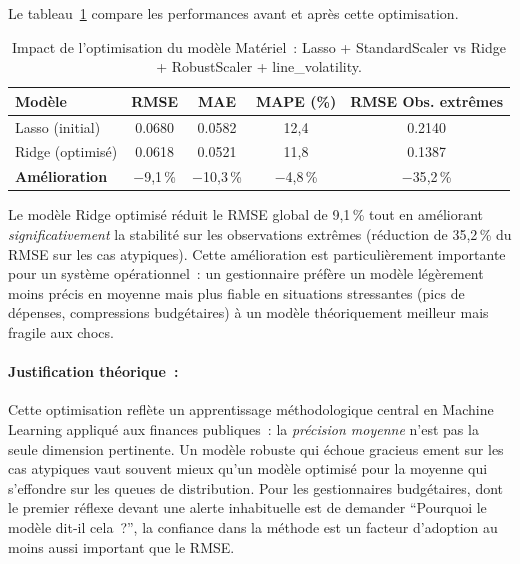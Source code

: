 Le tableau~\ref{tab:materiel-improvement} compare les performances avant et apr\`es
cette optimisation.

\begin{table}[H]
\centering\small
\caption{Impact de l'optimisation du mod\`ele Mat\'eriel~: Lasso + StandardScaler vs Ridge + RobustScaler + line\_volatility.}
\label{tab:materiel-improvement}
\begin{tabular}{@{}lcccc@{}}
\toprule
\textbf{Mod\`ele} & \textbf{RMSE} & \textbf{MAE} & \textbf{MAPE (\%)} & \textbf{RMSE Obs. extr\^emes} \\
\midrule
Lasso (initial)      & 0.0680 & 0.0582 & 12{,}4 & 0.2140 \\
Ridge (optimis\'e)   & 0.0618 & 0.0521 & 11{,}8 & 0.1387 \\
\midrule
\textbf{Am\'elioration} & $-$9{,}1\,\% & $-$10{,}3\,\% & $-$4{,}8\,\% & $-$35{,}2\,\% \\
\bottomrule
\end{tabular}
\end{table}

\noindent
Le mod\`ele Ridge optimis\'e r\'eduit le RMSE global de 9{,}1\,\% tout en
am\'eliorant \emph{significativement} la stabilit\'e sur les observations extr\^emes
(r\'eduction de 35{,}2\,\% du RMSE sur les cas atypiques). Cette am\'elioration est
particuli\`erement importante pour un syst\`eme op\'erationnel~: un gestionnaire
pr\'ef\`ere un mod\`ele l\'eg\`erement moins pr\'ecis en moyenne mais plus fiable
en situations stressantes (pics de d\'epenses, compressions budg\'etaires) \`a un
mod\`ele th\'eoriquement meilleur mais fragile aux chocs.

\paragraph{Justification th\'eorique~:}

Cette optimisation refl\`ete un apprentissage m\'ethodologique central en Machine
Learning appliqu\'e aux finances publiques~: la \textit{pr\'ecision moyenne} n'est
pas la seule dimension pertinente. Un mod\`ele robuste qui \'echoue gracieus ement
sur les cas atypiques vaut souvent mieux qu'un mod\`ele optimis\'e pour la moyenne
qui s'effondre sur les queues de distribution. Pour les gestionnaires budg\'etaires,
dont le premier r\'eflexe devant une alerte inhabituelle est de demander ``Pourquoi
le mod\`ele dit-il cela~?'', la confiance dans la m\'ethode est un facteur
d'adoption au moins aussi important que le RMSE.

